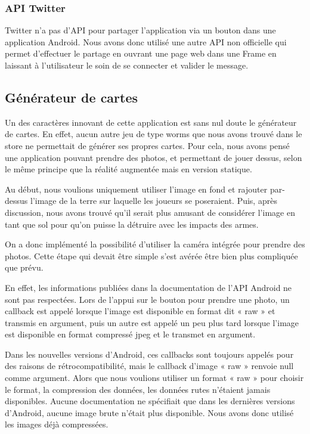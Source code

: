 \documentclass{report}
\begin{document}
\subsubsection{API Twitter}

Twitter n’a pas d’API pour partager l’application via un bouton dans une
application Android. Nous avons donc utilisé une autre API non
officielle qui permet d’effectuer le partage en ouvrant une page web
 dans une Frame en laissant à l’utilisateur le soin de se connecter et
 valider le message.

\subsection{Générateur de cartes}
\bigskip


Un des caractères innovant de cette application est sans nul doute le
générateur de cartes.
En effet, aucun autre jeu de type worms que nous avons trouvé dans le
store ne permettait de générer ses propres cartes. Pour cela, nous avons
pensé une application pouvant prendre des photos, et permettant de jouer
dessus, selon le même principe que la réalité augmentée mais en version
statique.
\bigskip

Au début, nous voulions uniquement utiliser l'image en fond et rajouter
par-dessus l'image de la terre sur laquelle les joueurs se poseraient.
Puis, après discussion, nous avons trouvé qu'il serait plus amusant de
considérer l'image en tant que sol pour qu'on puisse la détruire avec
les impacts des armes.
\bigskip

On a donc implémenté la possibilité d'utiliser la caméra intégrée pour
prendre des photos. Cette étape qui devait être simple s'est avérée être
bien plus compliquée que prévu.

En effet, les informations publiées dans
la documentation de l'API Android ne sont pas respectées. Lors de
l'appui sur le bouton pour prendre une photo, un callback est appelé
lorsque l'image est disponible en format dit « raw » et transmis en
argument, puis un autre est appelé un peu plus tard lorsque l'image est
disponible en format compressé jpeg et le transmet en argument.

Dans les nouvelles versions d'Android, ces callbacks sont toujours
appelés pour des raisons de rétrocompatibilité, mais le callback
d'image « raw » renvoie null comme argument. Alors que nous voulions
utiliser un format « raw » pour choisir le format, la compression des
données, les données rutes n'étaient jamais disponibles. Aucune
documentation ne spécifiait que dans les dernières versions d'Android,
aucune image brute n'était plus disponible. Nous avons donc utilisé les
images déjà compressées.
\bigskip
\end{document}
